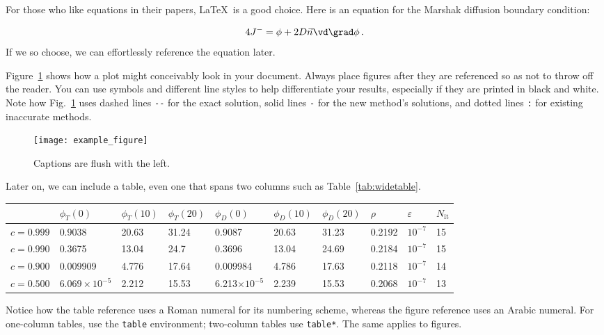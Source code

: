 \documentclass[review]{elsarticle}
\begin{document}
For those who like equations in their papers, \LaTeX\ is a good choice. Here is
an equation for the Marshak diffusion boundary condition:

\begin{equation} \label{eq:marshak}
  4 J^- = \phi + 2 D \vec{n} \vd \grad \phi \,.
\end{equation}
If we so choose, we can effortlessly reference the equation later.

Figure~\ref{fig:voltage} shows how a plot might conceivably look in your
document. Always place figures after they are referenced so as not to throw
off the reader. You can use symbols and different line styles to help
differentiate your results, especially if they are printed in black and white.
Note how Fig.~\ref{fig:voltage} uses dashed lines \verb|--| for the exact
solution, solid lines \verb|-| for the new method's solutions, and dotted lines
\verb|:| for existing inaccurate methods.
\begin{figure}[ht] %
  \centering
  \texttt{[image: example\_figure]}
  \caption{Captions are flush with the left.}
  \label{fig:voltage}
\end{figure}

Later on, we can include a table, even one that spans two columns such as
Table~\ref{tab:widetable}.
\begin{table*}[htb]
  \centering
\begin{tabular}{llllllllll}\toprule
      & $\phi_T(0)$      & $\phi_T(10)$      & $\phi_T(20)$      &
      $\phi_D(0)$      & $\phi_D(10)$      & $\phi_D(20)$      & $\rho$      &
      $\varepsilon$      & $N_\text{it}$
\\ \midrule
$c=0.999$  & 0.9038 & 20.63 & 31.24 & 0.9087 & 20.63 & 31.23 & 0.2192 & $10^{-7}$ & 15
\\
$c=0.990$  & 0.3675 & 13.04 & 24.7 & 0.3696 & 13.04 & 24.69 & 0.2184 & $10^{-7}$ & 15
\\
$c=0.900$  & 0.009909 & 4.776 & 17.64 & 0.009984 & 4.786 & 17.63 & 0.2118 & $10^{-7}$ & 14
\\
$c=0.500$  & $6.069\times 10^{-5}$ & 2.212 & 15.53 & 6.213$\times 10^{-5}$ & 2.239 & 15.53 & 0.2068 & $10^{-7}$ & 13
\\
\bottomrule
\end{tabular}
  \caption{This is an example of a really wide table which might not normally
  fit in the document.}
  \label{tab:widetable}
\end{table*}
Notice how the table reference uses a Roman numeral
for its numbering scheme, whereas the figure reference uses an Arabic numeral.
For one-column tables, use the \verb|table| environment; two-column tables use
\verb|table*|. The same applies to figures.
\end{document}

